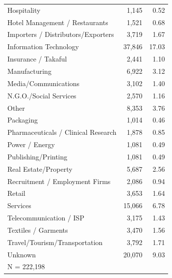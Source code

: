 \begin{tabular}{lrr}
Hospitality         &       1,145&        0.52\\
Hotel Management / Restaurants&       1,521&        0.68\\
Importers / Distributors/Exporters&       3,719&        1.67\\
Information Technology&      37,846&       17.03\\
Insurance / Takaful &       2,441&        1.10\\
Manufacturing       &       6,922&        3.12\\
Media/Communications&       3,102&        1.40\\
N.G.O./Social Services&       2,570&        1.16\\
Other               &       8,353&        3.76\\
Packaging           &       1,014&        0.46\\
Pharmaceuticals / Clinical Research&       1,878&        0.85\\
Power / Energy      &       1,081&        0.49\\
Publishing/Printing &       1,081&        0.49\\
Real Estate/Property&       5,687&        2.56\\
Recruitment / Employment Firms&       2,086&        0.94\\
Retail              &       3,653&        1.64\\
Services            &      15,066&        6.78\\
Telecommunication / ISP&       3,175&        1.43\\
Textiles / Garments &       3,470&        1.56\\
Travel/Tourism/Transportation&       3,792&        1.71\\
Unknown             &      20,070&        9.03\\
\midrule


\multicolumn{3}{l}{\footnotesize N =      222,198}\\


\bottomrule


\end{tabular}



